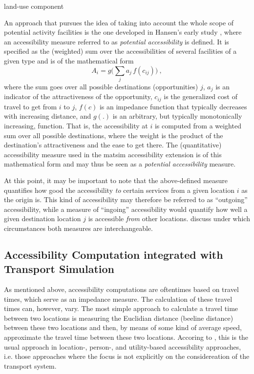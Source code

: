land-use component

An approach that pursues the idea of taking into account the whole scope of potential activity facilities is the one 
developed in Hansen's early study \citep{Hansen1959}, where an accessibility 
measure referred to as \textit{potential accessibility} is defined. It is specified as the (weighted) sum over the 
accessibilities of several facilities of a given type and is of the mathematical form
\begin{equation}
	A_i = g\Big( \sum_j a_j \, f(c_{ij}) \Big) \ ,
	\label{eq:accessibility:basic}
\end{equation}
where the sum goes over all possible destinations (opportunities) $j$, $a_j$ is an indicator of the attractiveness of 
the opportunity, $c_{ij}$ is the generalized cost of travel to get from $i$ to $j$, $f(c)$ is an impedance function that 
typically decreases with increasing distance, and $g(.)$ is an arbitrary, but typically monotonically increasing, function. 
That is, the accessibility at $i$ is computed from a weighted sum over all possible destinations, where the weight is the 
product of the destination's attractiveness and the ease to get there. The (quantitative) accessibility measure used 
in the \gls{matsim} accessibility extension is of this mathematical form and may thus be seen 
as a \textit{potential accessibility} measure.

At this point, it may be important to note that the above-defined measure quantifies how good the accessibility \textit{to} 
certain services from a given location $i$ as the origin is. This kind of accessibility may therefore be referred to 
as ``outgoing'' accessibility, while a measure of ``ingoing'' accessibility would quantify how well a given destination 
location $j$ is accessible \textit{from} other locations. \citet{NicolaiNagel2012HiResAccessibilityMethodInBook} 
discuss under which circumstances both measures are interchangeable.


\subsection{Accessibility Computation integrated with Transport Simulation}


As mentioned above, accessibility computations are oftentimes based on travel times, which serve as an impedance 
measure. The calculation of these travel times can, however, vary. The most simple approach to calculate a travel time 
between two locations is measuring the Euclidian distance (beeline distance) between these two locations and then, 
by means of some kind of average speed, approximate the travel time between these two locations. Accoring to 
\citet{Geurs2004AccessibilityReview}, this is the usual approach in location-, person-, and utility-based accessibility 
approaches, i.e. those approaches where the focus is not explicitly on the considereation of the transport system.

